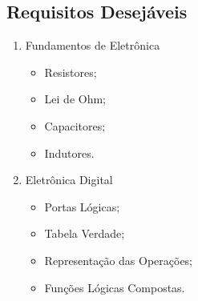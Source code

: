 \subsection*{Requisitos Desejáveis}
\begin{frame}{}
	\begin{enumerate}
		\item Fundamentos de Eletrônica
			\begin{itemize}
				\item Resistores;
				\item Lei de Ohm;
				\item Capacitores;
				\item Indutores.
			\end{itemize}
		\item Eletrônica Digital
			\begin{itemize}
				\item Portas Lógicas;
				\item Tabela Verdade;
				\item Representação das Operações;
				\item Funções Lógicas Compostas.
			\end{itemize}
	\end{enumerate}
\end{frame}